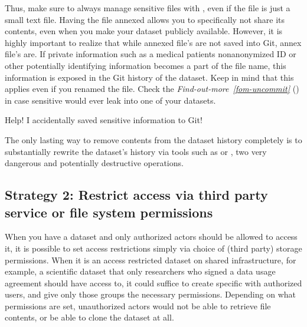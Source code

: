 \sphinxAtStartPar
Thus, make sure to always manage sensitive files with {\hyperref[\detokenize{glossary:term-git-annex}]{}}, even if the file is just a small text file.
Having the file annexed allows you to specifically not share its contents, even when you make your dataset publicly available.
However, it is highly important to realize that while annexed file’s  are not saved into Git, annex file’s  are.
If private information such as a medical patients non\sphinxhyphen{}anonymized ID or other potentially identifying information becomes a part of the file name, this information is exposed in the Git history of the dataset.
Keep in mind that this applies even if you renamed the file.
Check the \textit{Find-out-more}~{\findoutmoreiconinline}\textit{\ref{fom-uncommit}} {\hyperref[\detokenize{basics/101-139-privacy:fom-uncommit}]{}} () in case sensitive would ever leak into one of your datasets.

\ignorespaces \begin{findoutmore}[label={fom-uncommit}, before title={\thetcbcounter\ }, float, floatplacement=tb, check odd page=true]{Help! I accidentally saved sensitive information to Git!}
\label{\detokenize{basics/101-139-privacy:fom-uncommit}}

\sphinxAtStartPar
The only lasting way to remove contents from the dataset history completely is to substantially rewrite the dataset’s history via tools such as  or , two very dangerous and potentially destructive operations.


\end{findoutmore}


\subsection{Strategy 2: Restrict access via third party service or file system permissions}
\label{\detokenize{basics/101-139-privacy:strategy-2-restrict-access-via-third-party-service-or-file-system-permissions}}
\sphinxAtStartPar
When you have a dataset and only authorized actors should be allowed to access it,
it is possible to set access restrictions simply via choice of (third party) storage permissions.
When it is an access restricted dataset on shared infrastructure, for example, a scientific dataset that only researchers who signed a data usage agreement should have access to, it could suffice to create specific  with authorized users, and give only those groups the necessary permissions.
Depending on what permissions are set, unauthorized actors would not be able to retrieve file contents, or be able to clone the dataset at all.

